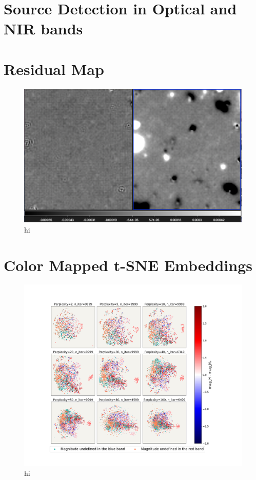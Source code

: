 \section{Source Detection in Optical and NIR bands}



\section{Residual Map}

\begin{figure}[h!]
    \centering
    \includegraphics[scale=0.5]{Code/Saved_Figures/comparing_residual_maps}
    \caption{hi}
    \label{Comparing_residual_maps}
\end{figure}

\newpage
\section{Color Mapped t-SNE Embeddings}

\begin{figure}[h!]
    \centering
    \includegraphics[trim={5cm 3cm 5cm 3cm},clip,width=\textwidth]{Code/Saved_Figures/peplex_H_Ks.pdf}
    \caption{hi}
    \label{embeddding_H_ks}
\end{figure}

